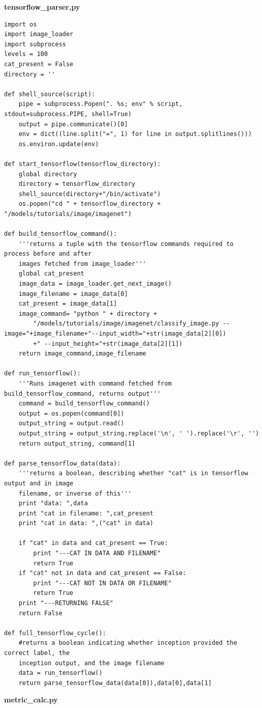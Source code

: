 \documentclass{report}
\begin{document}
\normalsize
\textbf{tensorflow\_parser,py}
\footnotesize
\begin{lstlisting}[style=Python2]
import os 
import image_loader
import subprocess
levels = 100
cat_present = False
directory = ''

def shell_source(script):
	pipe = subprocess.Popen(". %s; env" % script, stdout=subprocess.PIPE, shell=True)
	output = pipe.communicate()[0]
	env = dict((line.split("=", 1) for line in output.splitlines()))
	os.environ.update(env)

def start_tensorflow(tensorflow_directory):
	global directory
	directory = tensorflow_directory
	shell_source(directory+"/bin/activate")
	os.popen("cd " + tensorflow_directory + "/models/tutorials/image/imagenet")

def build_tensorflow_command():
	'''returns a tuple with the tensorflow commands required to process before and after 
	images fetched from image_loader'''
	global cat_present
	image_data = image_loader.get_next_image()
	image_filename = image_data[0]
	cat_present = image_data[1]
	image_command= "python " + directory + 
		"/models/tutorials/image/imagenet/classify_image.py --image="+image_filename+"--input_width="+str(image_data[2][0])
		+" --input_height="+str(image_data[2][1])
	return image_command,image_filename

def run_tensorflow():
	'''Runs imagenet with command fetched from build_tensorflow_command, returns output'''
	command = build_tensorflow_command()
	output = os.popen(command[0])
	output_string = output.read()
	output_string = output_string.replace('\n', ' ').replace('\r', '')
	return output_string, command[1]

def parse_tensorflow_data(data):
	'''returns a boolean, describing whether "cat" is in tensorflow output and in image 
	filename, or inverse of this'''
	print "data: ",data
	print "cat in filename: ",cat_present
	print "cat in data: ",("cat" in data)

	if "cat" in data and cat_present == True:
		print "---CAT IN DATA AND FILENAME"
		return True
	if "cat" not in data and cat_present == False:
		print "---CAT NOT IN DATA OR FILENAME"
		return True
	print "---RETURNING FALSE"
	return False

def full_tensorflow_cycle():
	#returns a boolean indicating whether inception provided the correct label, the 
	inception output, and the image filename
	data = run_tensorflow()
	return parse_tensorflow_data(data[0]),data[0],data[1]
\end{lstlisting}
\normalsize
\textbf{metric\_calc.py}
\end{document}
